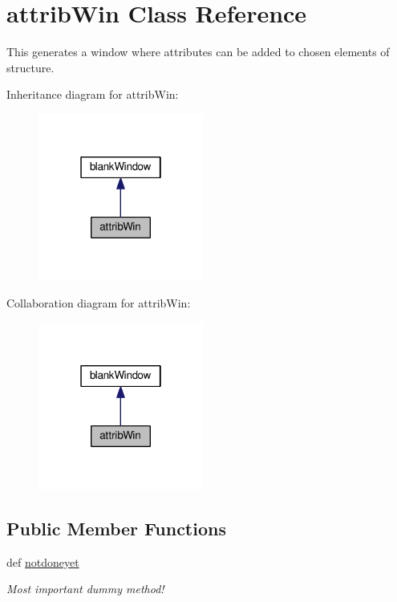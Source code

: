 \hypertarget{classgui_1_1window3a_1_1attribWin}{\section{attrib\-Win Class Reference}
\label{classgui_1_1window3a_1_1attribWin}
}


This generates a window where attributes can be added to chosen elements of structure.  




Inheritance diagram for attrib\-Win\-:\nopagebreak
\begin{figure}[H]
\begin{center}
\leavevmode
\includegraphics[width=154pt]{classgui_1_1window3a_1_1attribWin__inherit__graph}
\end{center}
\end{figure}


Collaboration diagram for attrib\-Win\-:\nopagebreak
\begin{figure}[H]
\begin{center}
\leavevmode
\includegraphics[width=154pt]{classgui_1_1window3a_1_1attribWin__coll__graph}
\end{center}
\end{figure}
\subsection*{Public Member Functions}
\begin{DoxyCompactItemize}
\item 
\hypertarget{classgui_1_1window3a_1_1attribWin_a615f3073891733337c33f599f89ec7ef}{def \hyperlink{classgui_1_1window3a_1_1attribWin_a615f3073891733337c33f599f89ec7ef}{notdoneyet}}\label{classgui_1_1window3a_1_1attribWin_a615f3073891733337c33f599f89ec7ef}

\begin{DoxyCompactList}\small\item\em Most important dummy method! \end{DoxyCompactList}\end{DoxyCompactItemize}


